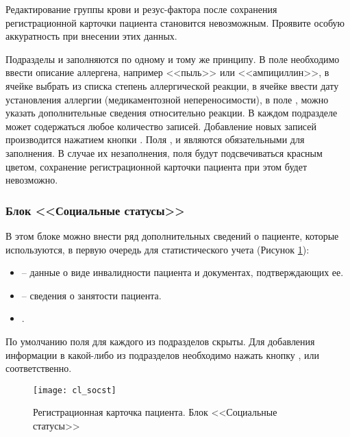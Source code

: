 {\begin{vnim}
Редактирование группы крови и резус-фактора после сохранения регистрационной карточки пациента становится невозможным. Проявите особую аккуратность при внесении этих данных.
\end{vnim}

Подразделы  и  заполняются по одному и тому же принципу. В поле   необходимо ввести описание аллергена, например <<пыль>> или <<ампициллин>>, в ячейке  выбрать из списка степень аллергической реакции, в ячейке  ввести дату установления аллергии (медикаментозной непереносимости), в поле , можно указать дополнительные сведения относительно реакции. В каждом подразделе может содержаться любое количество записей. Добавление новых записей производится нажатием кнопки . Поля ,  и  являются обязательными для заполнения. В случае их незаполнения, поля будут подсвечиваться красным цветом, сохранение регистрационной карточки пациента при этом будет невозможно.

\subsubsection{Блок <<Социальные статусы>>} 

В этом блоке можно внести ряд дополнительных сведений о пациенте, которые используются, в первую очередь для статистического учета (Рисунок \ref{img_cl_socst}): 
\begin{itemize}
 \item {} -- данные о виде инвалидности пациента и документах, подтверждающих ее.
 \item {} -- сведения о занятости пациента.
 \item {}.
\end{itemize}

По умолчанию поля для каждого из подразделов скрыты. Для добавления информации в какой-либо из подразделов необходимо нажать кнопку ,  или  соответственно.

\begin{figure}[ht]\centering
 \texttt{[image: cl\_socst]}
 \caption{Регистрационная карточка пациента. Блок <<Социальные статусы>>}
 \label{img_cl_socst}
\end{figure} 

}
